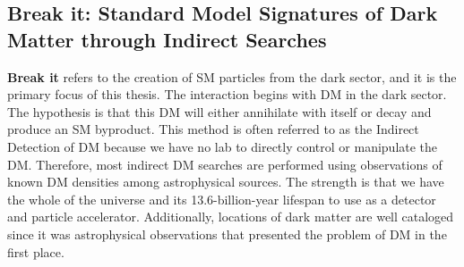 \begin{figure}[h]
\end{figure}

\subsection{Break it: Standard Model Signatures of Dark Matter through Indirect Searches\label{sec:break_it}}

\textbf{Break it} refers to the creation of SM particles from the dark sector, and it is the primary focus of this thesis.
The interaction begins with DM in the dark sector.
The hypothesis is that this DM will either annihilate with itself or decay and produce an SM byproduct.
This method is often referred to as the Indirect Detection of DM because we have no lab to directly control or manipulate the DM.
Therefore, most indirect DM searches are performed using observations of known DM densities among astrophysical sources.
The strength is that we have the whole of the universe and its 13.6-billion-year lifespan to use as a detector and particle accelerator.
Additionally, locations of dark matter are well cataloged since it was astrophysical observations that presented the problem of DM in the first place.

